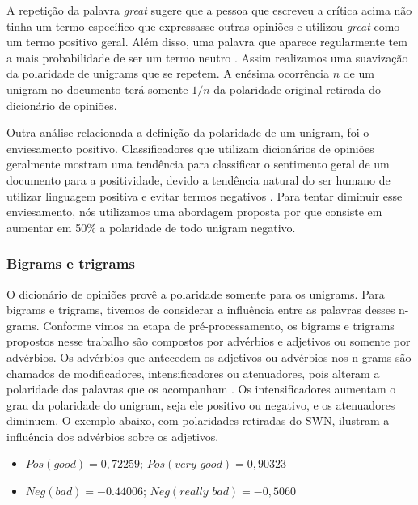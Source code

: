A repetição da palavra \textit{great} sugere que a pessoa que escreveu a crítica acima não tinha um termo específico que expressasse outras opiniões e utilizou \textit{great} como um termo positivo geral. Além disso, uma palavra que aparece regularmente tem a mais probabilidade de ser um termo neutro \cite{taboada2011lexicon}. Assim realizamos uma suavização da polaridade de unigrams que se repetem. A enésima ocorrência $n$ de um unigram no documento terá somente $1/n$ da polaridade original retirada do dicionário de opiniões.

Outra análise relacionada a definição da polaridade de um unigram, foi o enviesamento positivo. Classificadores que utilizam dicionários de opiniões geralmente mostram uma tendência para classificar o sentimento geral de um documento para a positividade, devido a tendência natural do ser humano de utilizar linguagem positiva e evitar termos negativos \cite{boucher1969pollyanna, kennedy2006sentiment}. Para tentar diminuir esse enviesamento, nós utilizamos uma abordagem proposta por  que consiste em aumentar em 50\% a polaridade de todo unigram negativo. 

\subsubsection{Bigrams e trigrams}

O dicionário de opiniões provê a polaridade somente para os unigrams. Para bigrams e trigrams, tivemos de considerar a influência entre as palavras desses n-grams. Conforme vimos na etapa de pré-processamento, os bigrams e trigrams propostos nesse trabalho são compostos por advérbios e adjetivos ou somente por advérbios. Os advérbios que antecedem os adjetivos ou advérbios nos n-grams são chamados de modificadores, intensificadores ou atenuadores, pois alteram a polaridade das palavras que os acompanham \cite{voll2007not}. Os intensificadores aumentam o grau da polaridade do unigram, seja ele positivo ou negativo, e os atenuadores diminuem. O exemplo abaixo, com polaridades retiradas do SWN, ilustram a influência dos advérbios sobre os adjetivos.  


\begin{itemize}
\item \label{itm:very_exem} $Pos(\textit{good}) = 0,72259$; $Pos(\textit{very good}) = 0,90323$
\item \label{itm:really_exem} $Neg(\textit{bad}) = -0.44006$; $Neg(\textit{really bad}) = -0,5060$
\end{itemize}

